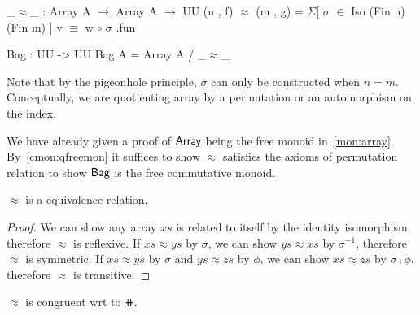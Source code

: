 \begin{code}
_$\approx$_ : Array A $\to$ Array A $\to$ UU
(n , f) $\approx$ (m , g) = $\Sigma$[ $\sigma$ $\in$ Iso (Fin n) (Fin m) ] v $\equiv$ w $\circ$ $\sigma$ .fun

Bag : UU -> UU
Bag A = Array A / _$\approx$_
\end{code}

Note that by the pigeonhole principle, $\sigma$ can only be constructed when $n = m$. Conceptually,
we are quotienting array by a permutation or an automorphism on the index.

We have already given a proof of $\operatorname{\mathsf{Array}}$ being the free monoid in~\cref{mon:array}.
By~\cref{cmon:qfreemon} it suffices to show $\approx$ satisfies the axioms of permutation relation
to show $\operatorname{\mathsf{Bag}}$ is the free commutative monoid.

\begin{proposition}
    $\approx$ is a equivalence relation.
\end{proposition}

\begin{proof}
    We can show any array $xs$ is related to itself by the identity isomorphism, therefore $\approx$ is reflexive.
    If $xs \approx ys$ by $\sigma$, we can show $ys \approx xs$ by $\sigma^{-1}$, therefore $\approx$ is symmetric.
    If $xs \approx ys$ by $\sigma$ and $ys \approx zs$ by $\phi$, we can show $xs \approx zs$ by $\sigma \comp \phi$,
    therefore $\approx$ is transitive.
\end{proof}

\begin{proposition}\label{bag:cong}
    $\approx$ is congruent wrt to $\doubleplus$.
\end{proposition}

